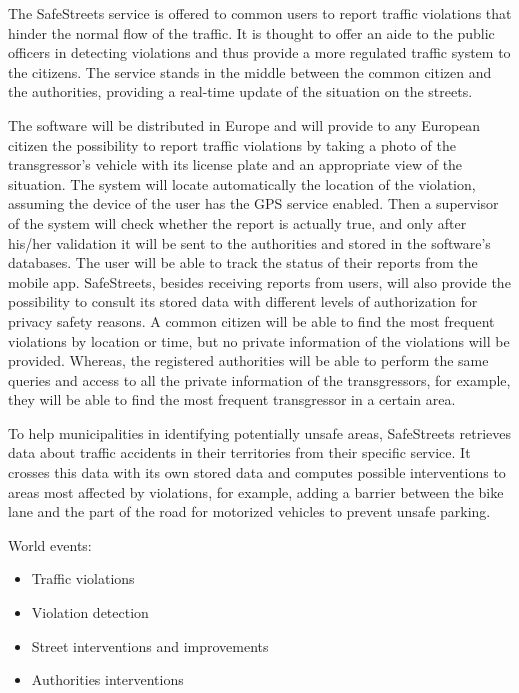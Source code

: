 The SafeStreets service is offered to common users to report traffic violations that hinder the normal flow of the traffic. It is thought to offer an aide to the public officers in detecting violations and thus provide a more regulated traffic system to the citizens. The service stands in the middle between the common citizen and the authorities, providing a real-time update of the situation on the streets.

The software will be distributed in Europe and will provide to any European citizen the possibility to report traffic violations by taking a photo of the transgressor's vehicle with its license plate and an appropriate view of the situation. The system will locate automatically the location of the violation, assuming the device of the user has the GPS service enabled. Then a supervisor of the system will check whether the report is actually true, and only after his/her validation it will be sent to the authorities and stored in the software's databases. The user will be able to track the status of their reports from the mobile app. SafeStreets, besides receiving reports from users, will also provide the possibility to consult its stored data with different levels of authorization for privacy safety reasons. A common citizen will be able to find the most frequent violations by location or time, but no private information of the violations will be provided. Whereas, the registered authorities will be able to perform the same queries and access to all the private information of the transgressors, for example, they will be able to find the most frequent transgressor in a certain area.

To help municipalities in identifying potentially unsafe areas, SafeStreets retrieves data about traffic accidents in their territories from their specific service. It crosses this data with its own stored data and computes possible interventions to areas most affected by violations, for example, adding a barrier between the bike lane and the part of the road for motorized vehicles to prevent unsafe parking.


World events:
\begin{itemize}
    \item Traffic violations
    \item Violation detection
    \item Street interventions and improvements
    \item Authorities interventions
\end{itemize}

